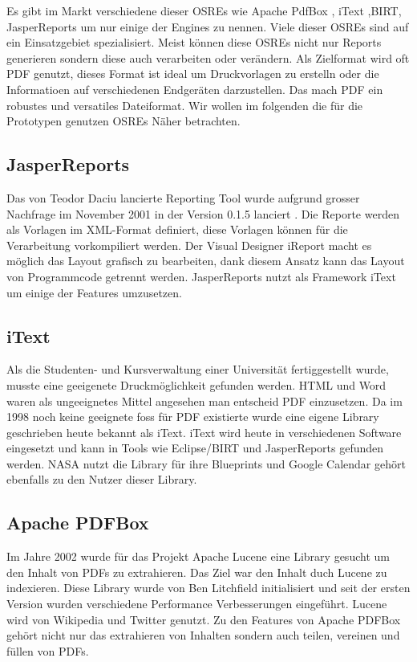 \documentclass[main.tex]{subfiles}
\begin{document}
Es gibt im Markt verschiedene dieser OSREs wie  Apache PdfBox , iText ,BIRT, JasperReports um nur einige der Engines zu nennen. Viele dieser OSREs sind auf ein Einsatzgebiet spezialisiert. Meist können diese OSREs nicht nur Reports generieren sondern diese auch verarbeiten oder verändern. Als Zielformat wird oft PDF genutzt, dieses Format ist ideal um Druckvorlagen zu erstelln oder die Informatioen auf verschiedenen Endgeräten darzustellen. Das mach PDF ein robustes und versatiles Dateiformat. 
Wir wollen im folgenden die für die Prototypen genutzen OSREs Näher betrachten. 


\subsection{JasperReports\textregistered}
Das von Teodor Daciu lancierte Reporting Tool wurde aufgrund grosser Nachfrage im November 2001 in der Version 0.1.5 lanciert \cite[Kapitel~1]{heffelfinger_2009}. Die Reporte werden als Vorlagen im XML-Format definiert, diese Vorlagen können für die Verarbeitung vorkompiliert werden. Der Visual Designer iReport macht es möglich das Layout grafisch zu bearbeiten, dank diesem Ansatz kann das Layout von Programmcode getrennt werden. JasperReports nutzt als Framework iText um einige der Features umzusetzen. 


\subsection{iText}
Als die Studenten- und Kursverwaltung einer Universität fertiggestellt wurde, musste eine geeigenete Druckmöglichkeit gefunden werden. HTML und Word waren als ungeeignetes Mittel angesehen man entscheid PDF einzusetzen. Da im 1998 noch keine geeignete \acrshort{foss} für PDF existierte wurde eine eigene Library geschrieben heute bekannt als iText. iText wird heute in verschiedenen Software eingesetzt und kann in Tools wie Eclipse/BIRT und JasperReports gefunden werden. NASA  nutzt die Library für ihre Blueprints und Google Calendar gehört ebenfalls zu den Nutzer dieser Library. \cite{lowagie_2010}

\subsection{Apache PDFBox}
Im Jahre 2002 wurde für das Projekt Apache Lucene eine Library gesucht um den Inhalt von PDFs zu extrahieren. Das Ziel war den Inhalt duch Lucene zu indexieren. Diese Library wurde von Ben Litchfield initialisiert und seit der ersten Version wurden verschiedene Performance Verbesserungen eingeführt. Lucene wird von Wikipedia und Twitter genutzt. Zu den Features von Apache PDFBox gehört nicht nur das extrahieren von Inhalten sondern auch teilen, vereinen und füllen von PDFs. 
\cite{apachepdfbox_history}
\end{document}
